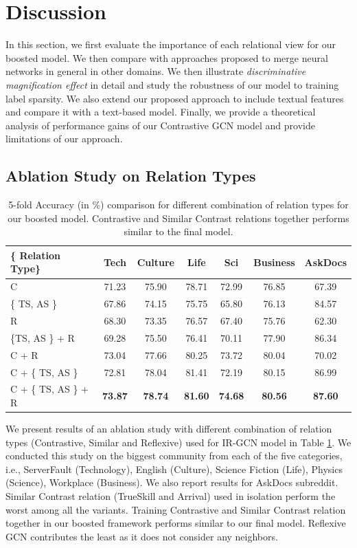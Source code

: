 \section{Discussion}
\label{sec:discussion}
In this section, we first evaluate the importance of each relational view for our boosted model. We then compare with approaches proposed to merge neural networks in general in other domains. We then illustrate \emph{discriminative magnification effect} in detail and study the robustness of our model to training label sparsity.  We also extend our proposed approach to include textual features and compare it with a text-based model. Finally, we provide a theoretical analysis of performance gains of our Contrastive GCN model and provide limitations of our approach.

\subsection{Ablation Study on Relation Types}
\begin{table}[h]
 \centering
  \robustify\bfseries
  \begin{tabular}{l | c | c| c| c|c | c}
    \toprule
       {\{ Relation Type\}} &
        {Tech} &
        {Culture} &
        {Life} &
        {Sci}&
        {Business} & {AskDocs}\\
      \midrule
      C & 71.23 &75.90 &78.71&72.99 & 76.85 & 67.39\\
    \{ TS, AS \} & 67.86 &74.15 &75.75&65.80& 76.13 & 84.57 \\
    R & 68.30 & 73.35 & 76.57 & 67.40 & 75.76 & 62.30\\
    \{TS, AS \} + R & 69.28 & 75.50 &76.41 &70.11 &77.90 & 86.34  \\
    C + R & 73.04 & 77.66 & 80.25 &73.72 & 80.04 & 70.02\\
    C + \{ TS, AS \} & 72.81 & 78.04 & 81.41 & 72.19 & 80.15 & 86.99\\
    C + \{ TS, AS \} + R & \bfseries 73.87 & \bfseries 78.74 & \bfseries 81.60&  \bfseries74.68&  \bfseries80.56 & \bfseries 87.60\\
    \bottomrule
  \end{tabular}
  \caption{\label{tab:relation} 5-fold Accuracy (in \%) comparison for different combination of relation types for our boosted model. Contrastive and Similar Contrast relations together performs similar to the final model.}
\end{table}
We present results of an ablation study with different combination of relation types (Contrastive, Similar and Reflexive) used for IR-GCN model in Table \ref{tab:relation}. We conducted this study on the biggest community from each of the five categories, i.e., ServerFault (Technology), English (Culture), Science Fiction (Life), Physics (Science), Workplace (Business). We also report results for AskDocs subreddit.
Similar Contrast relation (TrueSkill and Arrival) used in isolation perform the worst among all the variants. Training Contrastive and Similar Contrast relation together in our boosted framework performs similar to our final model. Reflexive GCN contributes the least as it does not consider any neighbors.

